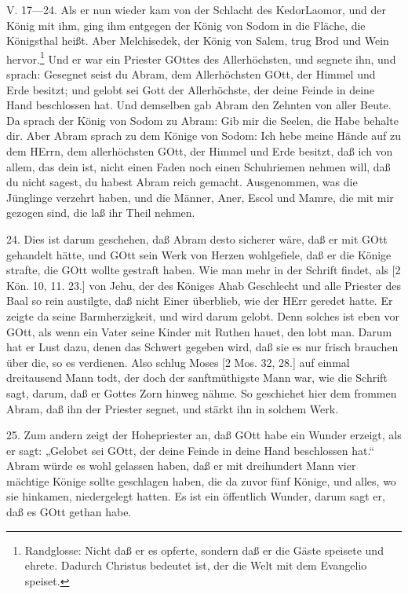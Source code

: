 \begin{schriftzitat}
V. 17—24. Als er nun wieder kam von der Schlacht des KedorLaomor, und der König mit ihm, ging ihm entgegen der König von Sodom in die Fläche, die Königsthal heißt. Aber Melchisedek, der König von Salem, trug Brod und Wein hervor.\footnote{Randglosse: Nicht daß er es opferte, sondern daß er die Gäste speisete und ehrete. Dadurch Christus bedeutet ist, der die Welt mit dem Evangelio speiset.} Und er war ein Priester GOttes des Allerhöchsten, und segnete ihn, und sprach: Gesegnet seist du Abram, dem Allerhöchsten GOtt, der Himmel und Erde besitzt; und gelobt sei Gott der Allerhöchste, der deine Feinde in deine Hand beschlossen hat. Und demselben gab Abram den Zehnten von aller Beute. Da sprach der König von Sodom zu Abram: Gib mir die Seelen, die Habe behalte dir. Aber Abram sprach zu dem Könige von Sodom: Ich hebe meine Hände auf zu dem HErrn, dem allerhöchsten GOtt, der Himmel und Erde besitzt, daß ich von allem, das dein ist, nicht einen Faden noch einen Schuhriemen nehmen will, daß du nicht sagest, du habest Abram reich gemacht. Ausgenommen, was die Jünglinge verzehrt haben, und die Männer, Aner, Escol und Mamre, die mit mir gezogen sind, die laß ihr Theil nehmen.
\end{schriftzitat}

24. Dies ist darum geschehen, daß Abram desto sicherer wäre, daß er mit GOtt gehandelt hätte, und GOtt sein Werk von Herzen wohlgefiele, daß er die Könige strafte, die GOtt wollte gestraft haben. Wie man mehr in der Schrift findet, als [2 Kön. 10, 11. 23.] von Jehu, der des Königes Ahab Geschlecht und alle Priester des Baal so rein austilgte, daß nicht Einer überblieb, wie der HErr geredet hatte. Er zeigte da seine Barmherzigkeit, und wird darum gelobt. Denn solches ist eben vor GOtt, als wenn ein Vater seine Kinder mit Ruthen hauet, den lobt man. Darum hat er Lust dazu, denen das Schwert gegeben wird, daß sie es nur frisch brauchen über die, so es verdienen. Also schlug Moses [2 Mos. 32, 28.] auf einmal dreitausend Mann todt, der doch der sanftmüthigste Mann war, wie die Schrift sagt, darum, daß er Gottes Zorn hinweg nähme. So geschiehet hier dem frommen Abram, daß ihn der Priester segnet, und stärkt ihn in solchem Werk.

25. Zum andern zeigt der Hohepriester an, daß GOtt habe ein Wunder erzeigt, als er sagt: „Gelobet sei GOtt, der deine Feinde in deine Hand beschlossen hat.“ Abram würde es wohl gelassen haben, daß er mit dreihundert Mann vier mächtige Könige sollte geschlagen haben, die da zuvor fünf Könige, und alles, wo sie hinkamen, niedergelegt hatten. Es ist ein öffentlich Wunder, darum sagt er, daß es GOtt gethan habe.

